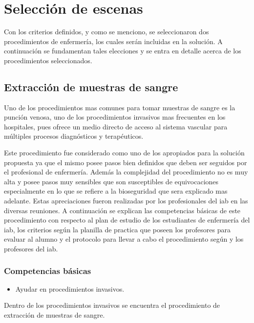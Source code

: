 \section{Selección de escenas}
\label{sec:seleccion_escenas}

Con los criterios definidos, y como se menciono, se seleccionaron dos procedimientos de enfermería, los cuales serán incluidas en la solución. A continuación se fundamentan tales elecciones y se entra en 
detalle acerca de los procedimientos seleccionados.

\subsection{Extracción de muestras de sangre}

Uno de los procedimientos mas comunes para tomar muestras de sangre es la punción venosa, uno de los 
procedimientos invasivos mas frecuentes en los hospitales, pues ofrece un medio directo de acceso al 
sistema vascular para múltiples procesos diagnósticos y terapéuticos.

Este procedimiento fue considerado como uno de los apropiados para la solución propuesta ya que el mismo
posee pasos bien definidos que deben ser seguidos por el profesional de enfermería. Además la complejidad
del procedimiento no es muy alta y posee pasos muy sensibles que son susceptibles de equivocaciones especialmente en lo que se refiere a la bioseguridad que sera explicado mas adelante. Estas apreciaciones
fueron realizadas por los profesionales del \Gls{iab} en las diversas reuniones. A continuación se
explican las competencias básicas de este procedimiento con respecto al plan de estudio de los estudiantes
de enfermería del \Gls{iab}, los criterios según la planilla de practica que poseen los profesores para evaluar al alumno y el protocolo para llevar a cabo el procedimiento según \cite{oms:extraccion} y los profesores del \Gls{iab}.

\subsubsection{Competencias básicas}
\begin{itemize}
\item Ayudar en procedimientos invasivos.
\end{itemize}

Dentro de los procedimientos invasivos se encuentra el procedimiento de extracción de muestras de sangre.

